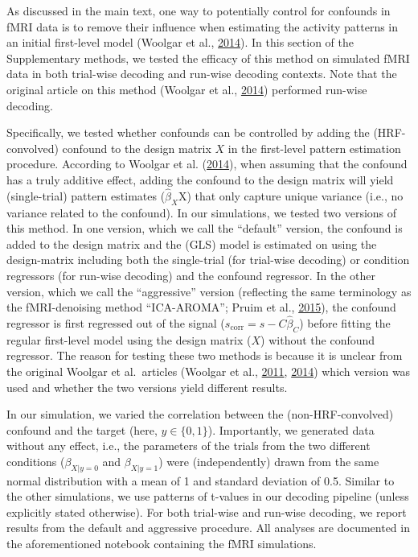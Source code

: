\documentclass[12pt,american,a4paper,oneside,]{memoir} %
\begin{document}
As discussed in the main text, one way to potentially control for confounds in fMRI data is to remove their influence when estimating the activity patterns in an initial first-level model (Woolgar et al., \protect\hyperlink{ref-Woolgar2014-jb}{2014}). In this section of the Supplementary methods, we tested the efficacy of this method on simulated fMRI data in both trial-wise decoding and run-wise decoding contexts. Note that the original article on this method (Woolgar et al., \protect\hyperlink{ref-Woolgar2014-jb}{2014}) performed run-wise decoding.

Specifically, we tested whether confounds can be controlled by adding the (HRF-convolved) confound to the design matrix \(X\) in the first-level pattern estimation procedure. According to Woolgar et al. (\protect\hyperlink{ref-Woolgar2014-jb}{2014}), when assuming that the confound has a truly additive effect, adding the confound to the design matrix will yield (single-trial) pattern estimates (\(\hat{\beta}_{X}\)X) that only capture unique variance (i.e., no variance related to the confound). In our simulations, we tested two versions of this method. In one version, which we call the ``default'' version, the confound is added to the design matrix and the (GLS) model is estimated on using the design-matrix including both the single-trial (for trial-wise decoding) or condition regressors (for run-wise decoding) and the confound regressor. In the other version, which we call the ``aggressive'' version (reflecting the same terminology as the fMRI-denoising method ``ICA-AROMA''; Pruim et al., \protect\hyperlink{ref-pruim2015ica}{2015}), the confound regressor is first regressed out of the signal (\(s_{\mathrm{corr}} = s- C\hat{\beta}_{C}\)) before fitting the regular first-level model using the design matrix (\(X\)) without the confound regressor. The reason for testing these two methods is because it is unclear from the original Woolgar et al.~articles (Woolgar et al., \protect\hyperlink{ref-woolgar2011multi}{2011}, \protect\hyperlink{ref-Woolgar2014-jb}{2014}) which version was used and whether the two versions yield different results.

In our simulation, we varied the correlation between the (non-HRF-convolved) confound and the target (here, \(y \in \{0,1\}\)). Importantly, we generated data without any effect, i.e., the parameters of the trials from the two different conditions (\(\beta_{X | y = 0}\) and \(\beta_{X | y = 1}\)) were (independently) drawn from the same normal distribution with a mean of 1 and standard deviation of 0.5. Similar to the other simulations, we use patterns of t-values in our decoding pipeline (unless explicitly stated otherwise). For both trial-wise and run-wise decoding, we report results from the default and aggressive procedure. All analyses are documented in the aforementioned notebook containing the fMRI simulations.
\end{document}
